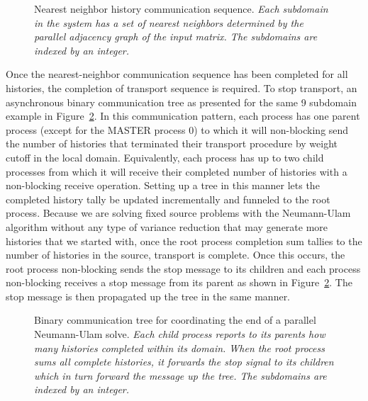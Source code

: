 \documentclass{snamc2013}
\begin{document}
\begin{figure}[h!]
  \begin{center}
    \scalebox{0.7}{  }
  \end{center}
  \caption{Nearest neighbor history communication sequence.
    \textit{Each subdomain in the system has a set of nearest
      neighbors determined by the parallel adjacency graph of the
      input matrix. The subdomains are indexed by an integer.}}
  \label{fig:nearest_neighbor_comm}
\end{figure}

Once the nearest-neighbor communication sequence has been completed
for all histories, the completion of transport sequence is
required. To stop transport, an asynchronous binary communication tree
as presented for the same 9 subdomain example in
Figure~\ref{fig:binary_comm_tree}. In this communication pattern, each
process has one parent process (except for the MASTER process 0) to
which it will non-blocking send the number of histories that
terminated their transport procedure by weight cutoff in the local
domain. Equivalently, each process has up to two child processes from
which it will receive their completed number of histories with a
non-blocking receive operation. Setting up a tree in this manner lets
the completed history tally be updated incrementally and funneled to
the root process. Because we are solving fixed source problems with
the Neumann-Ulam algorithm without any type of variance reduction that
may generate more histories that we started with, once the root
process completion sum tallies to the number of histories in the
source, transport is complete. Once this occurs, the root process
non-blocking sends the stop message to its children and each process
non-blocking receives a stop message from its parent as shown in
Figure~\ref{fig:binary_comm_tree}. The stop message is then propagated
up the tree in the same manner.

\begin{figure}[h!]
  \begin{center}
    \scalebox{0.6}{
       }
  \end{center}
  \caption{Binary communication tree for coordinating the end of a
    parallel Neumann-Ulam solve. \textit{Each child process reports to
      its parents how many histories completed within its domain. When
      the root process sums all complete histories, it forwards the
      stop signal to its children which in turn forward the message up
      the tree. The subdomains are indexed by an integer.}}
  \label{fig:binary_comm_tree}
\end{figure}
\end{document}

